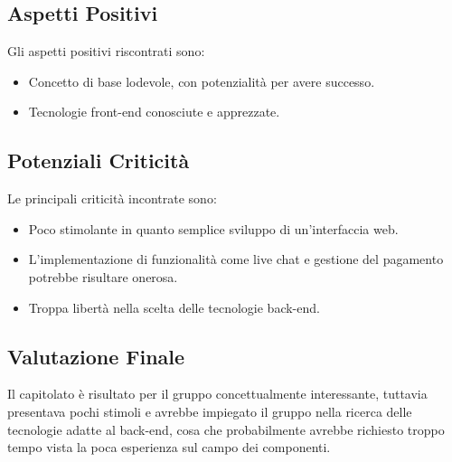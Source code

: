 \subsection{Aspetti Positivi}
	Gli aspetti positivi riscontrati sono:
	\begin{itemize}
	\item Concetto di base lodevole, con potenzialità per avere successo.
	\item Tecnologie front-end conosciute e apprezzate.
	\end{itemize}

\subsection{Potenziali Criticità}
	Le principali criticità incontrate sono:
	\begin{itemize}
		\item Poco stimolante in quanto semplice sviluppo di un'interfaccia web.
		\item L'implementazione di funzionalità come live chat e gestione del pagamento potrebbe risultare onerosa.
		\item Troppa libertà nella scelta delle tecnologie back-end.  
	\end{itemize}

\subsection{Valutazione Finale}
	Il capitolato è risultato per il gruppo concettualmente interessante, tuttavia presentava pochi stimoli e avrebbe impiegato il gruppo nella ricerca delle tecnologie adatte al back-end, cosa che probabilmente avrebbe richiesto troppo tempo vista la poca esperienza sul campo dei componenti.